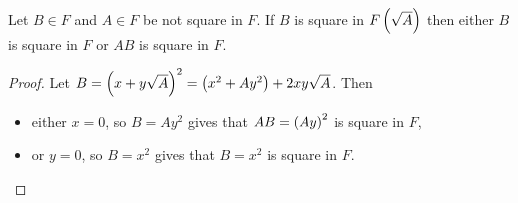 
\begin{lemma}
\label{lem:biquadratic}
Let $ B \in F $ and $ A \in F $ be not square in $ F $. If $ B $ is square in $ F\left( \sqrt{A} \right) $ then either $ B $ is square in $ F $ or $ AB $ is square in $ F $.
\end{lemma}

\begin{proof}
Let $ B = \left( x + y\sqrt{A} \right)^2 = \left( x^2 + Ay^2 \right) + 2xy\sqrt{A} $. Then
\begin{itemize}
\item either $ x = 0 $, so $ B = Ay^2 $ gives that $ AB = \left( Ay \right)^2 $ is square in $ F $,
\item or $ y = 0 $, so $ B = x^2 $ gives that $ B = x^2 $ is square in $ F $.
\end{itemize}
\end{proof}

